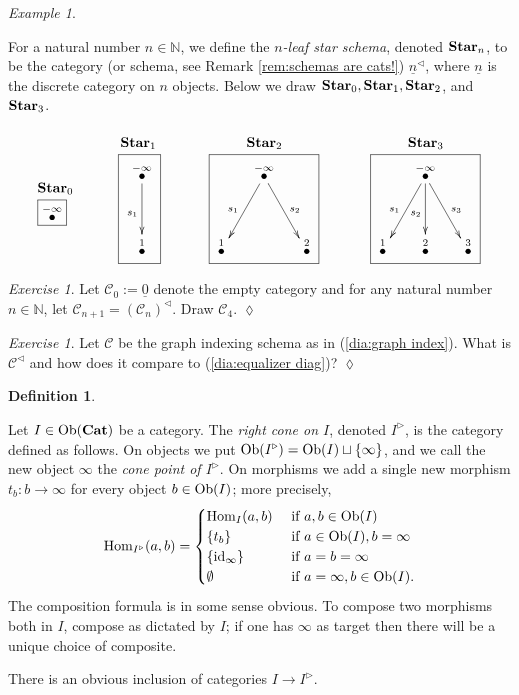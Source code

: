 \documentclass{book}
\def\tn{\textnormal}
\def\mc{\mathcal}
\def\NN{{\mathbb N}}
\def\Hom{\tn{Hom}}
\def\Ob{\tn{Ob}}
\newcommand{\boxtitle}[1]{\begin{center}#1\end{center}\vspace{-.1in}}
\def\lcone{^\triangleleft}
\def\rcone{^\triangleright}
\def\to{\rightarrow}
\def\taking{\colon}
\def\ul{\underline}
\newcommand{\LMO}[1]{\stackrel{#1}{\bullet}}
\def\id{\tn{id}}
\def\Cat{{\bf Cat}}
\def\Star{{\bf Star}}
\def\mcC{\mc{C}}
\theoremstyle{remark}
\newtheorem{example}[subsubsection]{Example}
\newtheorem{exc}[subsubsection]{Exercise}
\newenvironment{exercise}{\begin{exc}}{\hspace*{\fill}$\lozenge$\end{exc}}
\theoremstyle{definition}
\newtheorem{definition}[subsubsection]{Definition}
\begin{document}
\begin{example}\label{ex:stars}\index{a category!$\Star_n$}

For a natural number $n\in\NN$, we define the {\em $n$-leaf star schema}, denoted $\Star_n$, to be the category (or schema, see Remark \ref{rem:schemas are cats!}) $\ul{n}\lcone$, where $\ul{n}$ is the discrete category on $n$ objects. Below we draw $\Star_0, \Star_1, \Star_2$, and $\Star_3$.
$$
\parbox{.3in}{\boxtitle{$\Star_0$}\fbox{$\LMO{-\infty}$}}
\hspace{.5in}
\parbox{.4in}{\boxtitle{$\Star_1$}\fbox{\xymatrix@=15pt{\LMO{-\infty}\ar[dd]_{s_1}\\\\\LMO{1}}}}
\hspace{.5in}
\parbox{1.1in}{\boxtitle{$\Star_2$}\fbox{\xymatrix@=15pt{&\LMO{-\infty}\ar[ddl]_{s_1}\ar[ddr]^{s_2}\\\\\LMO{1}&&\LMO{2}}}}
\hspace{.5in}
\parbox{1.1in}{\boxtitle{$\Star_3$}\fbox{\xymatrix@=15pt{&\LMO{-\infty}\ar[ddl]_{s_1}\ar[dd]_{s_2}\ar[ddr]^{s_3}\\\\\LMO{1}&\LMO{2}&\LMO{3}}}}
$$

\end{example}

\begin{exercise}
Let $\mcC_0:=\ul{0}$ denote the empty category and for any natural number $n\in\NN$, let $\mcC_{n+1}=(\mcC_n)\lcone.$ Draw $\mcC_4$.  
\end{exercise}

\begin{exercise}
Let $\mcC$ be the graph indexing schema as in (\ref{dia:graph index}). What is $\mcC\lcone$ and how does it compare to (\ref{dia:equalizer diag})? 
\end{exercise}

\begin{definition}\label{def:rcone}

Let $I\in\Ob(\Cat)$ be a category. The {\em right cone on $I$}, denoted $I\rcone$,\index{a symbol!$\rcone$} is the category defined as follows. On objects we put $\Ob(I\rcone)=\Ob(I)\sqcup\{\infty\}$, and we call the new object $\infty$ the {\em cone point of $I\rcone$}. On morphisms we add a single new morphism $t_b\taking b\to\infty$ for every object $b\in \Ob(I)$; more precisely,
$$\Hom_{I\rcone}(a,b)=
\begin{cases}
\Hom_I(a,b)&\tn{ if }a,b\in\Ob(I)\\
\{t_b\}&\tn{ if }a\in\Ob(I), b=\infty\\
\{\id_{\infty}\}&\tn{ if } a=b=\infty\\
\emptyset&\tn{ if } a=\infty,b\in\Ob(I).
\end{cases}$$
The composition formula is in some sense obvious. To compose two morphisms both in $I$, compose as dictated by $I$; if one has $\infty$ as target then there will be a unique choice of composite.

There is an obvious inclusion of categories $I\to I\rcone$.

\end{definition}
\end{document}
